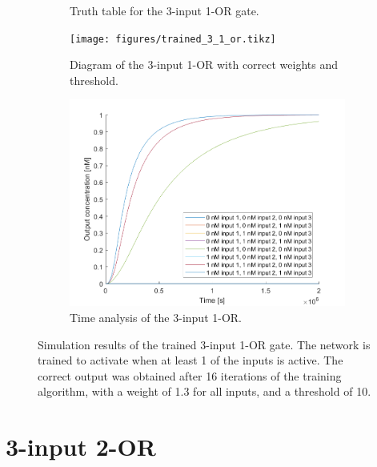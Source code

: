 \begin{figure}[H]
\begin{subfigure}[t]{.49\columnwidth}
\begin{adjustbox}{width=\textwidth}
\begin{tabular}[b]{cccc}
    \hline
    \end{tabular}
  \end{adjustbox}
    \caption{Truth table for the 3-input 1-OR gate.}
\end{subfigure}
\begin{subfigure}[t]{.49\textwidth}
  \texttt{[image: figures/trained\_3\_1\_or.tikz]}
  \caption{Diagram of the 3-input 1-OR with correct weights and threshold.}
\end{subfigure}
\hfill
\begin{subfigure}[t]{\textwidth}
  \centering
\includegraphics[width=\textwidth]{images/or_1_simulation_3input.png}
\caption{Time analysis of the 3-input 1-OR.}
\end{subfigure}
\caption{Simulation results of the trained 3-input 1-OR gate. The network is trained to activate when at least 1 of the inputs is active. The correct output was obtained after 16 iterations of the training algorithm, with a weight of 1.3 for all inputs, and a threshold of 10.}
\label{3_1_or}
\end{figure}

\section{3-input 2-OR}


